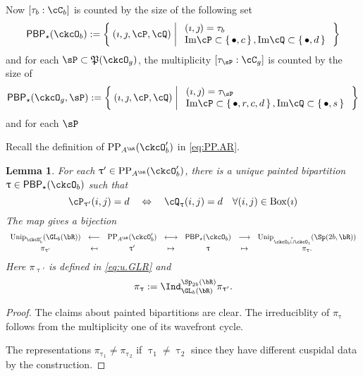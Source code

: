 \documentclass[12pt,a4paper]{amsart}
\def\Im{\operatorname{Im}}
\numberwithin{equation}{section}
\newtheorem{lem}[thm]{Lemma}
\theoremstyle{remark}
\def\Unip{\mathrm{Unip}}
\def\PP{\mathrm{PP}}
\def\BOX#1{\mathrm{Box}(#1)}
\providecommand\mapsfrom{\scalebox{-1}[1]{$\mapsto$}}
\def\Im{\mathrm{Im}}
\def\cuprow{{\stackrel{r}{\sqcup}}}
\def\CPP{\mathfrak{P}}
\begin{document}
Now $[\tau_{b}:\cC_{b}]$ is counted by the size of the following set
\[
  \PBP_{\star}(\ckcO_b) := \Set{(\imath,\jmath,\cP,\cQ)| %
    \begin{array}{l}
      (\imath,\jmath) = \tau_{b}\\
      \Im \cP \subset \set{\bullet,c}, \Im \cQ \subset\set{\bullet,d}\\
    \end{array}
  }
\]
and for each $\sP\subset \CPP(\ckcO_{g})$, the multiplicity
$[\tau_{\sP}: \cC_{g}]$ is counted by the size of
\[
  \PBP_{\star}(\ckcO_g,\sP):= \Set{(\imath,\jmath,\cP,\cQ)| %
    \begin{array}{l}
      (\imath,\jmath) = \tau_{\sP}\\
      \Im \cP \subset \set{\bullet,r,c,d}, \Im \cQ \subset\set{\bullet, s}\\
    \end{array}
  }
\]
and for each $\sP$

Recall the definition of $\PP_{A^{\bR}}(\ckcO'_{b})$ in  \eqref{eq:PP.AR}.

\begin{lem}
  For each $\uptau' \in \PP_{A^{\bR}}(\ckcO'_{b})$, there is a unique painted
  bipartition $\uptau\in \PBP_{\star}(\ckcO_{b})$ such that
  \[
    \cP_{\uptau'}(i,j) = d \quad %
    \Leftrightarrow
    \quad
    \cQ_{\uptau}(i,j) = d \quad \forall (i,j)\in \BOX{\imath}\\
  \]
  The map gives a bijection
  \[
    \begin{array}{ccccccc}
      \Unip_{\ckcO'_{b}}(\GL_{b}(\bR))&\longleftarrow
      &\PP_{A^{\bR}}(\ckcO'_{b}) & \longleftrightarrow
      & \PBP_{\star}(\ckcO_{b}) & \longrightarrow
      & \Unip_{\ckcO_{b}\cuprow \ckcO_{1}}(\Sp(2b,\bR))\\
      \pi_{\uptau'} & \mapsfrom & \uptau' & \mapsto
      & \uptau & \mapsto & \pi_{\uptau}.
    \end{array}
  \]
  Here $\pi_{\uptau'}$ is defined in \eqref{eq:u.GLR} and
  \[
    \pi_{\uptau} := \Ind_{\GL_{b}(\bR)}^{\Sp_{2b}(\bR)} \pi_{\uptau'}.
  \]
\end{lem}
\begin{proof}
  The claims about painted bipartitions are clear.
  The irreduciblity of $\pi_{\uptau}$ follows from the multiplicity one
  of its wavefront cycle.

  The representations $\pi_{\uptau_{1}}\neq \pi_{\uptau_{2}}$ if
  $\uptau_{1}\neq \uptau_{2}$ since they have different cuspidal data by the
  construction.
\end{proof}
\end{document}
